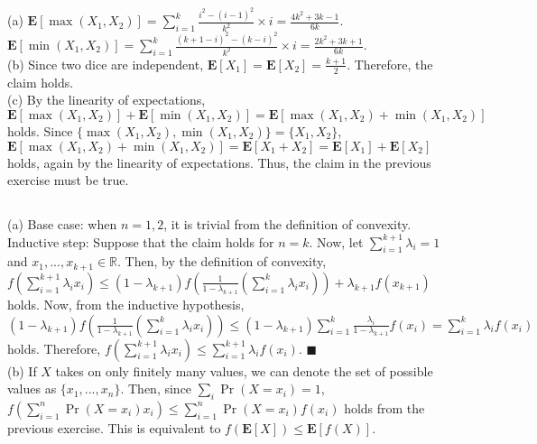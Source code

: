 \documentclass{article}
\begin{document}
\subsection{}
(a) $\textbf{E}[\max(X_1,X_2)]=\sum\limits_{i=1}^k\frac{i^2-(i-1)^2}{k^2}\times i=\frac{4k^2+3k-1}{6k}$.\\
$\textbf{E}[\min(X_1,X_2)]=\sum\limits_{i=1}^k\frac{(k+1-i)^2-(k-i)^2}{k^2}\times i=\frac{2k^2+3k+1}{6k}$.\\
(b) Since two dice are independent, $\textbf{E}[X_1]=\textbf{E}[X_2]=\frac{k+1}{2}$. Therefore, the claim holds.\\
(c) By the linearity of expectations, $\textbf{E}[\max(X_1,X_2)]+\textbf{E}[\min(X_1,X_2)]=\textbf{E}[\max(X_1,X_2)+\min(X_1,X_2)]$ holds.
Since $\{\max(X_1,X_2),\min(X_1,X_2)\}=\{X_1,X_2\}$, $\textbf{E}[\max(X_1,X_2)+\min(X_1,X_2)]=\textbf{E}[X_1+X_2]=\textbf{E}[X_1]+\textbf{E}[X_2]$ holds, again by the linearity of expectations.
Thus, the claim in the previous exercise must be true.
\subsection{}
(a) Base case: when $n=1,2$, it is trivial from the definition of convexity.\\
Inductive step: Suppose that the claim holds for $n=k$.
Now, let $\sum\limits_{i=1}^{k+1}\lambda_i=1$ and $x_1,...,x_{k+1}\in \mathbb{R}$.
Then, by the definition of convexity,\\
$f(\sum\limits_{i=1}^{k+1}\lambda_ix_i)\leq(1-\lambda_{k+1})f(\frac{1}{1-\lambda_{k+1}}(\sum\limits_{i=1}^k\lambda_ix_i))+\lambda_{k+1}f(x_{k+1})$ holds.
Now, from the inductive hypothesis, $(1-\lambda_{k+1})f(\frac{1}{1-\lambda_{k+1}}(\sum\limits_{i=1}^k\lambda_ix_i))\leq(1-\lambda_{k+1})\sum\limits_{i=1}^k\frac{\lambda_i}{1-\lambda_{k+1}}f(x_i)=\sum\limits_{i=1}^{k}\lambda_if(x_i)$ holds.
Therefore, $f(\sum\limits_{i=1}^{k+1}\lambda_ix_i)\leq\sum\limits_{i=1}^{k+1}\lambda_if(x_i)$. $\blacksquare$\\
(b) If $X$ takes on only finitely many values, we can denote the set of possible values as $\{x_1,...,x_n\}$.
Then, since $\sum_i\Pr(X=x_i)=1$, $f(\sum\limits_{i=1}^n\Pr(X=x_i)x_i)\leq\sum\limits_{i=1}^n\Pr(X=x_i)f(x_i)$ holds from the previous exercise.
This is equivalent to $f(\textbf{E}[X])\leq\textbf{E}[f(X)]$.
\end{document}
